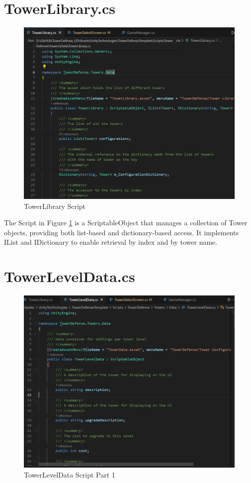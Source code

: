 \documentclass[12pt,a4paper]{report}
\begin{document}
\section{TowerLibrary.cs} 
\begin{figure}[h!]
	\centering
	\includegraphics[scale=0.8]{images/TowerLibrary.png}
	\caption{TowerLibrary Script}
	\label{fig:TowerLibrary}
\end{figure}

The Script in Figure \ref{fig:TowerLibrary} is a ScriptableObject that manages a collection of Tower objects, providing both list-based and dictionary-based access. It implements IList and IDictionary to enable retrieval by index and by tower name.

\section{TowerLevelData.cs} 
\begin{figure}[h!]
	\centering
	\includegraphics[scale=0.75]{images/TowerLevelData1.png}
	\caption{TowerLevelData Script Part 1}
	\label{fig:TowerLevelData1}
\end{figure}
\end{document}
